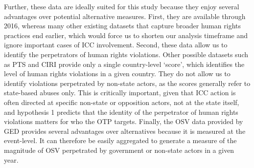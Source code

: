Further, these data are ideally suited for this study because they enjoy several advantages over potential alternative measures. First, they are available through 2016, whereas many other existing datasets that capture broader human rights practices end earlier, which would force us to shorten our analysis timeframe and ignore important cases of ICC involvement. Second, these data allow us to identify the perpetrators of human rights violations. Other possible datasets such as PTS and CIRI provide only a single country-level `score', which identifies the level of human rights violations in a given country. They do not allow us to identify violations perpetrated by non-state actors, as the scores generally refer to state-based abuses only. This is critically important, given that ICC action is often directed at specific non-state or opposition actors, not at the state itself, and hypothesis 1 predicts that the identity of the perpetrator of human rights violations matters for who the OTP targets. Finally, the OSV data provided by GED provides several advantages over alternatives because it is measured at the event-level. It can therefore be easily aggregated to generate a measure of the magnitude of OSV perpetrated by government or non-state actors in a given year. %

